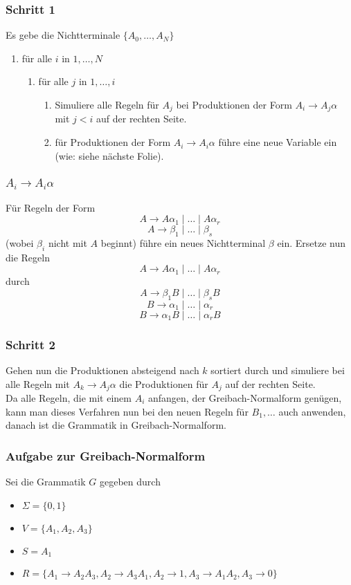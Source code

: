 \documentclass{beamer}
\begin{document}
{\begin{frame}
\frametitle{Schritt 1}
Es gebe die Nichtterminale $\{A_0, \ldots, A_N\}$
\begin{enumerate}
\item für alle $i$ in $1, \ldots, N$
\begin{enumerate}
\item für alle $j$ in $1, \ldots, i$
\begin{enumerate}
\item Simuliere alle Regeln für $A_j$ bei Produktionen der Form $A_i \rightarrow A_j\alpha$ mit $j < i$ auf der rechten Seite.
\item für Produktionen der Form $A_i \rightarrow A_i\alpha$ führe eine neue Variable ein (wie: siehe nächste Folie).
\end{enumerate}
\end{enumerate}
\end{enumerate}
\end{frame}

\begin{frame}
\frametitle{$A_i \rightarrow A_i\alpha$}
Für Regeln der Form 
$$A \rightarrow A\alpha_1 \mid \ldots \mid A\alpha_r$$
$$A \rightarrow \beta_1 \mid \ldots \mid \beta_s$$
(wobei $\beta_i$ nicht mit $A$ beginnt) führe ein neues Nichtterminal $\beta$ ein. Ersetze nun die Regeln
$$A \rightarrow A\alpha_1 \mid \ldots \mid A\alpha_r$$
durch
$$A \rightarrow \beta_1B \mid \ldots \mid \beta_sB$$
$$B \rightarrow \alpha_1 \mid \ldots \mid \alpha_r$$
$$B \rightarrow \alpha_1B \mid \ldots \mid \alpha_rB$$
\end{frame}

\begin{frame}
 \frametitle{Schritt 2}
Gehen nun die Produktionen absteigend nach $k$ sortiert durch und simuliere bei alle Regeln mit $A_k \rightarrow A_j\alpha$ die Produktionen für $A_j$ auf der rechten Seite.\\
Da alle Regeln, die mit einem $A_i$ anfangen, der Greibach-Normalform genügen, kann man dieses Verfahren nun bei den neuen Regeln für $B_1,\ldots$ auch anwenden, danach ist die Grammatik in Greibach-Normalform.
\end{frame}

\begin{frame}
\frametitle{Aufgabe zur Greibach-Normalform}
Sei die Grammatik $G$ gegeben durch
\begin{itemize}
 \item $\Sigma = \{0, 1\}$
 \item $V = \{A_1, A_2, A_3\}$
 \item $S = A_1$
 \item $R = \{A_1 \rightarrow A_2A_3, A_2 \rightarrow A_3A_1, A_2 \rightarrow 1, A_3 \rightarrow A_1A_2, A_3 \rightarrow 0\}$
\end{itemize}


\end{frame}}
\end{document}
